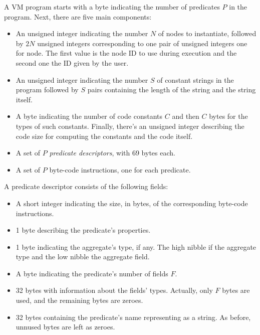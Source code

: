 \documentclass{article}
\begin{document}
\newcommand{\inst}[3]{#1&\byte#2\\\endbyte&{\it #3}\\}
\newcommand{\op}[2]{\ensuremath{#1}&\byte#2\\\endbyte\\}
\newcommand{\val}[3]{#1&\byte#2\\\endbyte&{\it #3}\\}


A VM program starts with a byte indicating the number of predicates $P$ in the
program. Next, there are five main components:

\begin{itemize}
	\item An unsigned integer indicating the number $N$ of nodes to instantiate, followed by $2N$ unsigned integers corresponding to one pair of unsigned integers one for node. The first value is the node ID to use during execution and the second one the ID given by the user.
	\item An unsigned integer indicating the number $S$ of constant strings in the program followed by $S$ pairs containing the length of the string and the string itself.
	\item A byte indicating the number of code constants $C$ and then $C$ bytes for the types of such constants. Finally, there's an unsigned integer describing the code size for computing the constants and the code itself.
	\item A set of $P$ \emph{predicate descriptors}, with 69 bytes each.
	\item A set of $P$ byte-code instructions, one for each predicate.
\end{itemize}

A predicate descriptor consists of the following fields:
\begin{itemize}
	\item A short integer indicating the size, in bytes, of the corresponding byte-code instructions.
	\item 1 byte describing the predicate's properties.
	\item 1 byte indicating the aggregate's type, if any. The high nibble if the aggregate type and the low nibble the aggregate field.
	\item A byte indicating the predicate's number of fields $F$.
	\item 32 bytes with information about the fields' types. Actually, only $F$ bytes are used, and the remaining bytes are zeroes.
	\item 32 bytes containing the predicate's name representing as a string. As before, unnused bytes are left as zeroes.
\end{itemize}
\end{document}
